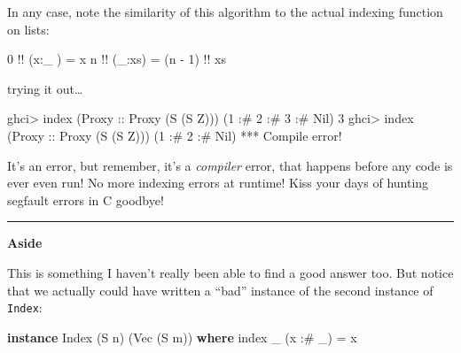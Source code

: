 \documentclass[]{article}
\newenvironment{Shaded}{}{}
\newcommand{\KeywordTok}[1]{\textcolor[rgb]{0.00,0.44,0.13}{\textbf{{#1}}}}
\newcommand{\DataTypeTok}[1]{\textcolor[rgb]{0.56,0.13,0.00}{{#1}}}
\newcommand{\DecValTok}[1]{\textcolor[rgb]{0.25,0.63,0.44}{{#1}}}
\newcommand{\OtherTok}[1]{\textcolor[rgb]{0.00,0.44,0.13}{{#1}}}
\newcommand{\FunctionTok}[1]{\textcolor[rgb]{0.02,0.16,0.49}{{#1}}}
\newcommand{\NormalTok}[1]{{#1}}
\begin{document}
In any case, note the similarity of this algorithm to the actual
indexing function on lists:

\begin{Shaded}
\begin{Highlighting}[]
\DecValTok{0} \FunctionTok{!!} \NormalTok{(x}\FunctionTok{:}\NormalTok{_ ) }\FunctionTok{=} \NormalTok{x}
\NormalTok{n }\FunctionTok{!!} \NormalTok{(_}\FunctionTok{:}\NormalTok{xs) }\FunctionTok{=} \NormalTok{(n }\FunctionTok{-} \DecValTok{1}\NormalTok{) }\FunctionTok{!!} \NormalTok{xs}
\end{Highlighting}
\end{Shaded}

trying it out\ldots{}

\begin{Shaded}
\begin{Highlighting}[]
\NormalTok{ghci}\FunctionTok{>} \NormalTok{index (}\DataTypeTok{Proxy}\OtherTok{ ::} \DataTypeTok{Proxy} \NormalTok{(}\DataTypeTok{S} \NormalTok{(}\DataTypeTok{S} \DataTypeTok{Z}\NormalTok{))) (}\DecValTok{1} \FunctionTok{:#} \DecValTok{2} \FunctionTok{:#} \DecValTok{3} \FunctionTok{:#} \DataTypeTok{Nil}\NormalTok{)}
\DecValTok{3}
\NormalTok{ghci}\FunctionTok{>} \NormalTok{index (}\DataTypeTok{Proxy}\OtherTok{ ::} \DataTypeTok{Proxy} \NormalTok{(}\DataTypeTok{S} \NormalTok{(}\DataTypeTok{S} \DataTypeTok{Z}\NormalTok{))) (}\DecValTok{1} \FunctionTok{:#} \DecValTok{2} \FunctionTok{:#} \DataTypeTok{Nil}\NormalTok{)}
\FunctionTok{***} \DataTypeTok{Compile} \NormalTok{error}\FunctionTok{!}
\end{Highlighting}
\end{Shaded}

It's an error, but remember, it's a \emph{compiler} error, that happens
before any code is ever even run! No more indexing errors at runtime!
Kiss your days of hunting segfault errors in C goodbye!

\begin{center}\rule{0.5\linewidth}{\linethickness}\end{center}

\textbf{Aside}

This is something I haven't really been able to find a good answer too.
But notice that we actually could have written a ``bad'' instance of the
second instance of \texttt{Index}:

\begin{Shaded}
\begin{Highlighting}[]
\KeywordTok{instance} \DataTypeTok{Index} \NormalTok{(}\DataTypeTok{S} \NormalTok{n) (}\DataTypeTok{Vec} \NormalTok{(}\DataTypeTok{S} \NormalTok{m)) }\KeywordTok{where}
    \NormalTok{index _ (x }\FunctionTok{:#} \NormalTok{_) }\FunctionTok{=} \NormalTok{x}
\end{Highlighting}
\end{Shaded}
\end{document}
